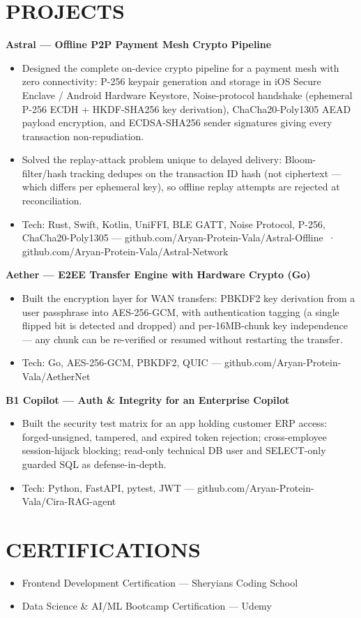 \documentclass[9pt]{article}
\begin{document}
\section*{PROJECTS}
\textbf{Astral  ---  Offline P2P Payment Mesh Crypto Pipeline}
\vspace{1pt}
\begin{itemize}[leftmargin=11pt,itemsep=0pt,topsep=1pt,parsep=0pt]
\item Designed the complete on-device crypto pipeline for a payment mesh with zero connectivity: P-256 keypair generation and storage in iOS Secure Enclave / Android Hardware Keystore, Noise-protocol handshake (ephemeral P-256 ECDH + HKDF-SHA256 key derivation), ChaCha20-Poly1305 AEAD payload encryption, and ECDSA-SHA256 sender signatures giving every transaction non-repudiation.
\item Solved the replay-attack problem unique to delayed delivery: Bloom-filter/hash tracking dedupes on the transaction ID hash (not ciphertext  ---  which differs per ephemeral key), so offline replay attempts are rejected at reconciliation.
\item Tech: Rust, Swift, Kotlin, UniFFI, BLE GATT, Noise Protocol, P-256, ChaCha20-Poly1305  ---  github.com/Aryan-Protein-Vala/Astral-Offline \,·\, github.com/Aryan-Protein-Vala/Astral-Network
\end{itemize}
\textbf{Aether  ---  E2EE Transfer Engine with Hardware Crypto (Go)}
\vspace{1pt}
\begin{itemize}[leftmargin=11pt,itemsep=0pt,topsep=1pt,parsep=0pt]
\item Built the encryption layer for WAN transfers: PBKDF2 key derivation from a user passphrase into AES-256-GCM, with authentication tagging (a single flipped bit is detected and dropped) and per-16MB-chunk key independence  ---  any chunk can be re-verified or resumed without restarting the transfer.
\item Tech: Go, AES-256-GCM, PBKDF2, QUIC  ---  github.com/Aryan-Protein-Vala/AetherNet
\end{itemize}
\textbf{B1 Copilot  ---  Auth \& Integrity for an Enterprise Copilot}
\vspace{1pt}
\begin{itemize}[leftmargin=11pt,itemsep=0pt,topsep=1pt,parsep=0pt]
\item Built the security test matrix for an app holding customer ERP access: forged-unsigned, tampered, and expired token rejection; cross-employee session-hijack blocking; read-only technical DB user and SELECT-only guarded SQL as defense-in-depth.
\item Tech: Python, FastAPI, pytest, JWT  ---  github.com/Aryan-Protein-Vala/Cira-RAG-agent
\end{itemize}
\section*{CERTIFICATIONS}
\begin{itemize}[leftmargin=11pt,itemsep=0pt,topsep=1pt,parsep=0pt]
\item Frontend Development Certification  ---  Sheryians Coding School
\item Data Science \& AI/ML Bootcamp Certification  ---  Udemy
\end{itemize}
\end{document}
